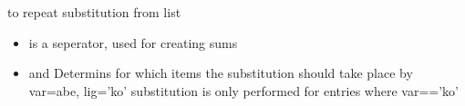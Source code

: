 \documentclass[letterpaper,10pt,english]{sphinxmanual}
\begin{document}

\begin{fulllineitems}
\label{\detokenize{onboard/modelmanipulation:modelmanipulation.oldsub_frml}}
\pysigstartsignatures
{}
\pysigstopsignatures
\sphinxAtStartPar
to repeat substitution from list
\begin{itemize}
\item {} 
\sphinxAtStartPar
{} is a seperator, used for creating sums

\item {} 
\sphinxAtStartPar
{} and  Determins for which items the substitution should take place
by var=abe, lig=’ko’ substitution is only performed for entries where var==’ko’

\end{itemize}

\end{fulllineitems}

\end{document}
